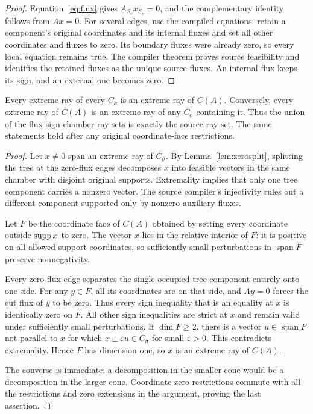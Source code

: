 \begin{proof}
Equation~\eqref{eq:flux} gives $A_{S_v}x_{S_v}=0$, and the complementary
identity follows from $Ax=0$. For several edges, use the compiled equations:
retain a component's original coordinates and its internal fluxes and set all
other coordinates and fluxes to zero. Its boundary fluxes were already zero,
so every local equation remains true. The compiler theorem proves source
feasibility and identifies the retained fluxes as the unique source fluxes.
An internal flux keeps its sign, and an external one becomes zero.
\end{proof}

\begin{theorem}
\label{thm:nonew}
Every extreme ray of every $C_\sigma$ is an extreme ray of $C(A)$. Conversely,
every extreme ray of $C(A)$ is an extreme ray of any $C_\sigma$ containing it.
Thus the union of the flux-sign chamber ray sets is exactly the source ray set.
The same statements hold after any original coordinate-face restrictions.
\end{theorem}

\begin{proof}
Let $x\ne0$ span an extreme ray of $C_\sigma$. By
Lemma~\ref{lem:zerosplit}, splitting the tree at the zero-flux edges decomposes
$x$ into feasible vectors in the same chamber with disjoint original supports.
Extremality implies that only one tree component carries a nonzero vector.
The source compiler's injectivity rules out a different component supported
only by nonzero auxiliary fluxes.

Let $F$ be the coordinate face of $C(A)$ obtained by setting every coordinate
outside $\operatorname{supp} x$ to zero. The vector $x$ lies in the relative interior of $F$:
it is positive on all allowed support coordinates, so sufficiently small
perturbations in $\operatorname{span}F$ preserve nonnegativity.

Every zero-flux edge separates the single occupied tree component entirely
onto one side. For any $y\in F$, all its coordinates are on that side, and
$Ay=0$ forces the cut flux of $y$ to be zero. Thus every sign inequality that
is an equality at $x$ is identically zero on $F$. All other sign inequalities
are strict at $x$ and remain valid under sufficiently small perturbations.
If $\dim F\geq2$, there is a vector $u\in\operatorname{span}F$ not parallel to
$x$ for which $x\pm\varepsilon u\in C_\sigma$ for small $\varepsilon>0$.
This contradicts extremality. Hence $F$ has dimension one, so $x$ is an extreme
ray of $C(A)$.

The converse is immediate: a decomposition in the smaller cone would be a
decomposition in the larger cone. Coordinate-zero restrictions commute with
all the restrictions and zero extensions in the argument, proving the last
assertion.
\end{proof}

